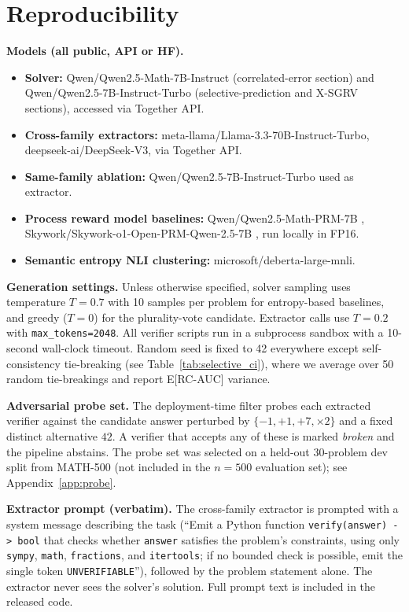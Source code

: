 \documentclass{article}
\begin{document}
\sloppy

\section{Reproducibility}
\label{app:repro}

\textbf{Models (all public, API or HF).}
\begin{itemize}[leftmargin=*,itemsep=1pt]
\item \textbf{Solver:} Qwen/Qwen2.5-Math-7B-Instruct (correlated-error section) and Qwen/Qwen2.5-7B-Instruct-Turbo (selective-prediction and X-SGRV sections), accessed via Together API.
\item \textbf{Cross-family extractors:} meta-llama/Llama-3.3-70B-Instruct-Turbo, deepseek-ai/DeepSeek-V3, via Together API.
\item \textbf{Same-family ablation:} Qwen/Qwen2.5-7B-Instruct-Turbo used as extractor.
\item \textbf{Process reward model baselines:} Qwen/Qwen2.5-Math-PRM-7B \citep{qwenprm2025}, Skywork/Skywork-o1-Open-PRM-Qwen-2.5-7B \citep{skyworkprm2024}, run locally in FP16.
\item \textbf{Semantic entropy NLI clustering:} microsoft/deberta-large-mnli.
\end{itemize}

\textbf{Generation settings.} Unless otherwise specified, solver sampling uses temperature $T{=}0.7$ with 10 samples per problem for entropy-based baselines, and greedy ($T{=}0$) for the plurality-vote candidate. Extractor calls use $T{=}0.2$ with \texttt{max\_tokens=2048}. All verifier scripts run in a subprocess sandbox with a 10-second wall-clock timeout. Random seed is fixed to 42 everywhere except self-consistency tie-breaking (see Table~\ref{tab:selective_ci}), where we average over 50 random tie-breakings and report E[RC-AUC] variance.

\textbf{Adversarial probe set.} The deployment-time filter probes each extracted verifier against the candidate answer perturbed by $\{-1, +1, +7, \times 2\}$ and a fixed distinct alternative $42$. A verifier that accepts any of these is marked \emph{broken} and the pipeline abstains. The probe set was selected on a held-out 30-problem dev split from MATH-500 (not included in the $n{=}500$ evaluation set); see Appendix~\ref{app:probe}.

\textbf{Extractor prompt (verbatim).} The cross-family extractor is prompted with a system message describing the task (``Emit a Python function \texttt{verify(answer) -> bool} that checks whether \texttt{answer} satisfies the problem's constraints, using only \texttt{sympy}, \texttt{math}, \texttt{fractions}, and \texttt{itertools}; if no bounded check is possible, emit the single token \texttt{UNVERIFIABLE}''), followed by the problem statement alone. The extractor never sees the solver's solution. Full prompt text is included in the released code.
\end{document}

